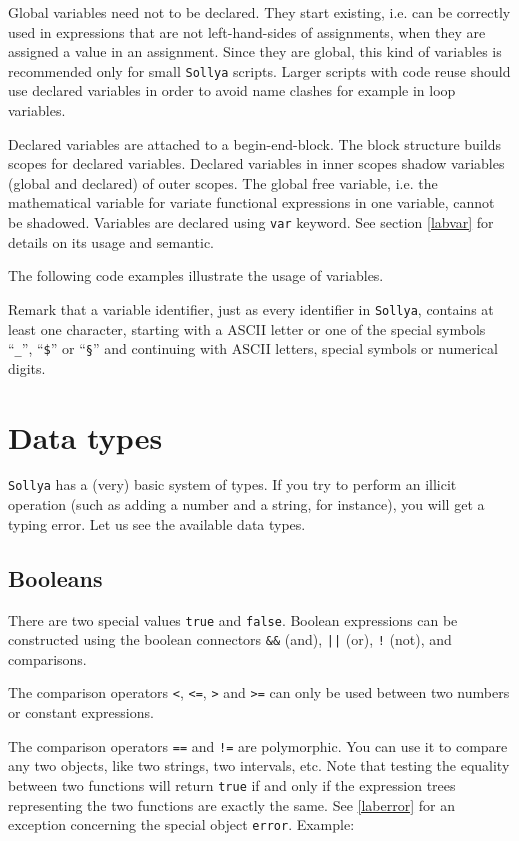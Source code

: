 \documentclass[a4paper]{article}
\newcommand{\key}[1]{\texttt{#1}}
\newcommand{\sollya}{\texttt{Sollya}\xspace}
\begin{document}
Global variables need not to be declared. They start existing,
i.e. can be correctly used in expressions that are not left-hand-sides
of assignments, when they are assigned a value in an assignment. Since
they are global, this kind of variables is recommended only for small
\sollya scripts.  Larger scripts with code reuse should use
declared variables in order to avoid name clashes for example in loop
variables.

Declared variables are attached to a begin-end-block. The block
structure builds scopes for declared variables. Declared variables in
inner scopes shadow variables (global and declared) of outer
scopes. The global free variable, i.e. the mathematical variable for
variate functional expressions in one variable, cannot be shadowed. Variables are
declared using \key{var} keyword. See section \ref{labvar} for details
on its usage and semantic.

The following code examples illustrate the usage of variables.




Remark that a variable identifier, just as every identifier in
\sollya, contains at least one character, starting with a ASCII letter
or one of the special symbols ``\texttt{\_}'', ``\texttt{\$}'' or
``\texttt{\S}'' and continuing with ASCII letters, special symbols or
numerical digits.



\section{Data types}
\sollya has a (very) basic system of types. If you try to perform an illicit operation (such as adding a number and a string, for instance), you will get a typing error. Let us see the available data types.

\subsection{Booleans}
There are two special values \key{true} and \key{false}. Boolean expressions can be constructed using the boolean connectors \key{\&\&} (and), \key{||} (or), \key{!} (not), and comparisons.

The comparison operators \key{<}, \key{<=}, \key{>} and \key{>=} can only be used between two numbers or constant expressions.

The comparison operators \key{==} and \key{!=} are polymorphic. You can use it to compare any two objects, like two strings, two intervals, etc. Note that testing the equality between two functions will return \key{true} if and only if the expression trees representing the two functions are exactly the same. See \ref{laberror} for an exception concerning the special object \key{error}. Example:
\end{document}
